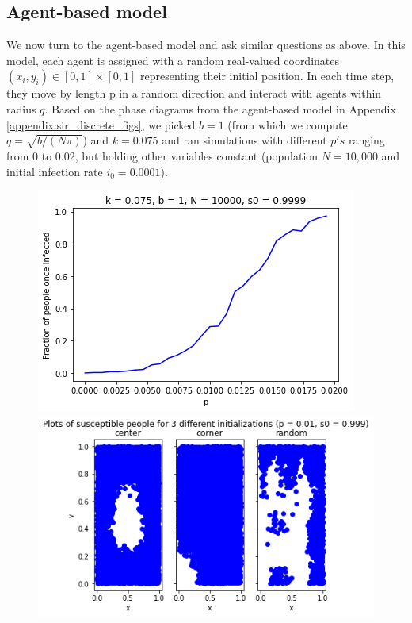 \documentclass[12pt, reqno]{amsart}
\begin{document}
    \subsection{Agent-based model}
    We now turn to the agent-based model and ask similar questions as above. In this model, each agent is assigned with a random real-valued coordinates \( (x_{i},y_{i}) \in [0,1]\times[0,1]\) representing their initial position. In each time step, they move by length p in a random direction and interact with agents within radius \(q\). Based on the phase diagrams from the agent-based model in Appendix \ref{appendix:sir_discrete_figs}, we picked \(b=1\) (from which we compute \(q = \sqrt{b/(N\pi)}\)) and \(k=0.075\) and ran simulations with different \(p's\) ranging from 0 to 0.02, but holding other variables constant (population \(N = 10,000\) and initial infection rate \(i_{0}=0.0001\)). 
    \begin{figure}[h]
        \centering
        \begin{minipage}[b]{0.4 \textwidth}
            \includegraphics[width=\textwidth]{./spatial_model/infected_p.png}
            \caption{}
            \label{fig:agent_p}
        \end{minipage}
        \hfill
        \begin{minipage}[b]{0.45 \textwidth}
            \includegraphics[width=\textwidth]{spatial_model/effects_initialization.png}
            \caption{}
            \label{fig:center_vs_corner}
        \end{minipage}
    \end{figure}
    
\end{document}
